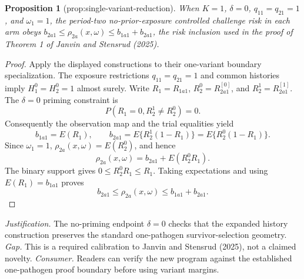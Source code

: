 \documentclass{article}
\newtheorem{proposition}{Proposition}
\begin{document}
\begin{proposition}[prop:single-variant-reduction]\label{prop:single-variant-reduction}
When \(K=1\), \(\delta=0\), \(q_{11}=q_{21}=1\), and \(\omega_1=1\), the period-two no-prior-exposure controlled challenge risk in each arm obeys \(b_{2a1}\leq\rho_{2a}(x,\omega)\leq b_{1a1}+b_{2a1}\), the risk inclusion used in the proof of Theorem 1 of Janvin and Stensrud (2025).
\end{proposition}
\begin{proof}
Apply the displayed constructions to their one-variant boundary specialization.  The exposure restrictions \(q_{11}=q_{21}=1\) and common histories imply \(H_1^0=H_2^0=1\) almost surely.  Write \(R_1=R_{1a1}\), \(R_2^0=R^{[0]}_{2a1}\), and \(R_2^1=R^{[1]}_{2a1}\).  The \(\delta=0\) priming constraint is
\[
P(R_1=0,R_2^1\ne R_2^0)=0.
\]
Consequently the observation map and the trial equalities yield
\[
b_{1a1}=E(R_1),
\qquad
b_{2a1}=E\{R_2^1(1-R_1)\}=E\{R_2^0(1-R_1)\}.
\]
Since \(\omega_1=1\), \(\rho_{2a}(x,\omega)=E(R_2^0)\), and hence
\[
\rho_{2a}(x,\omega)
=b_{2a1}+E(R_2^0R_1).
\]
The binary support gives \(0\leq R_2^0R_1\leq R_1\).  Taking expectations and using \(E(R_1)=b_{1a1}\) proves
\[
b_{2a1}\leq\rho_{2a}(x,\omega)\leq b_{1a1}+b_{2a1}.
\]
\end{proof}
\par\smallskip\noindent \textit{Justification.} The no-priming endpoint \(\delta=0\) checks that the expanded history construction preserves the standard one-pathogen survivor-selection geometry. \textit{Gap.} This is a required calibration to Janvin and Stensrud (2025), not a claimed novelty. \textit{Consumer.} Readers can verify the new program against the established one-pathogen proof boundary before using variant margins.
\end{document}
